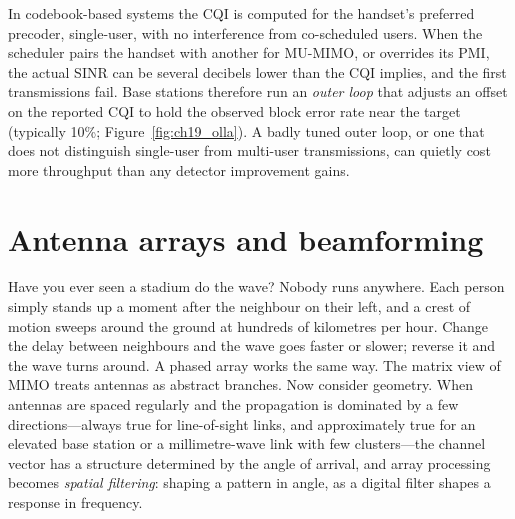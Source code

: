 \begin{pitfall}
In codebook-based systems the CQI is computed for the handset's preferred precoder, single-user,
with no interference from co-scheduled users. When the scheduler pairs the handset with another
for MU-MIMO, or overrides its PMI, the actual SINR can be several decibels lower than the CQI
implies, and the first transmissions fail. Base stations therefore run an \emph{outer loop} that
adjusts an offset on the reported CQI to hold the observed block error rate near the target
(typically 10\%; Figure~\ref{fig:ch19_olla}). A badly tuned outer loop, or one that does not
distinguish single-user from multi-user transmissions, can quietly cost more throughput than any
detector improvement gains.
\end{pitfall}


\section{Antenna arrays and beamforming}
\label{sec:ch19:arrays}

Have you ever seen a stadium do the wave? Nobody runs anywhere. Each person simply stands up a
moment after the neighbour on their left, and a crest of motion sweeps around the ground at
hundreds of kilometres per hour. Change the delay between neighbours and the wave goes faster or
slower; reverse it and the wave turns around. A phased array works the same way. The matrix view of
MIMO treats antennas as abstract branches. Now consider geometry. When antennas are spaced
regularly and the propagation is dominated by a few directions---always true for line-of-sight
links, and approximately true for an elevated base station or a millimetre-wave link with few
clusters---the channel vector has a structure determined by the angle of arrival, and array
processing becomes \emph{spatial filtering}: shaping a pattern in angle, as a digital filter
shapes a response in frequency.

